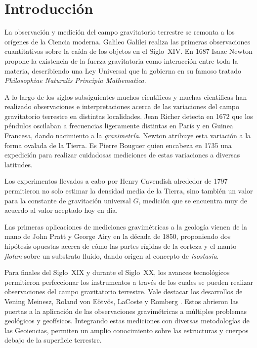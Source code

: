 \chapter{Introducción}

La observación y medición del campo gravitatorio terrestre se remonta a los
orígenes de la Ciencia moderna. Galileo Galilei realiza las primeras
observaciones cuantitativas sobre la caída de los objetos en el Siglo~XIV. En
1687 Isaac Newton propone la existencia de la fuerza gravitatoria como
interacción entre toda la materia, describiendo una Ley Universal que la
gobierna en su famoso tratado \emph{Philosophiae Naturalis Principia
Mathematica}.

A lo largo de los siglos subsiguientes muchos científicos y muchas científicas
han realizado observaciones e interpretaciones acerca de las variaciones del
campo gravitatorio terrestre en distintas localidades. Jean Richer detecta en
1672 que los péndulos oscilaban a frecuencias ligeramente distintas en París
y en Guinea Francesa, dando nacimiento a la \emph{gravimetría}. Newton atribuye
esta variación a la forma ovalada de la Tierra. Es Pierre Bouguer quien
encabeza en 1735 una expedición para realizar cuidadosas mediciones de estas
variaciones a diversas latitudes.

Los experimentos llevados a cabo por Henry Cavendish alrededor de 1797
permitieron no solo estimar la densidad media de la Tierra, sino también un
valor para la constante de gravitación universal $G$, medición que se encuentra
muy de acuerdo al valor aceptado hoy en día.

Las primeras aplicaciones de mediciones gravimétricas a la geología
vienen de la mano de John Pratt y George Airy en la década de 1850, proponiendo
dos hipótesis opuestas acerca de cómo las partes rígidas de la corteza y el
manto \emph{flotan} sobre un substrato fluido, dando origen al concepto de
\emph{isostasia}.

Para finales del Siglo~XIX y durante el Siglo~XX, los avances tecnológicos
permitieron perfeccionar los instrumentos a través de los cuales se pueden
realizar observaciones del campo gravitatorio terrestre. Vale destacar los
desarrollos de Vening Meinesz, Roland von Eötvös, LaCoste y Romberg
\citep{blakely1995}.
Estos abrieron las puertas a la aplicación de las observaciones gravimétricas
a múltiples problemas geológicos y geofísicos. Integrando estas mediciones con
diversas metodologías de las Geoiencias, permiten un amplio conocimiento sobre
las estructuras y cuerpos debajo de la superficie terrestre.

